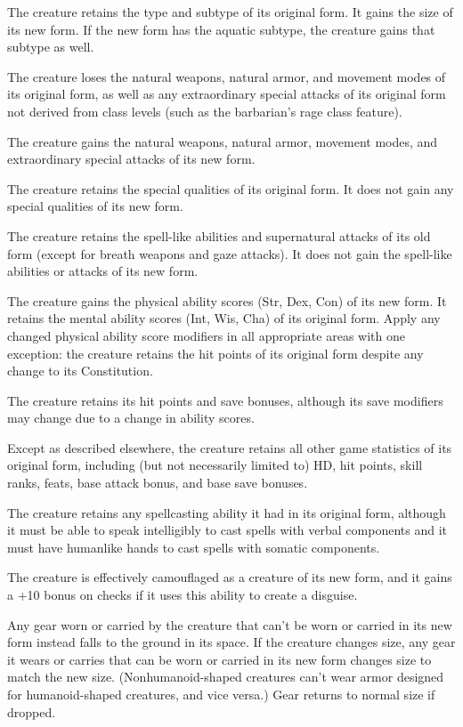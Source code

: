 \begin{itemize*}
\item The creature retains the type and subtype of its original form. It gains the size of its new form. If the new form has the aquatic subtype, the creature gains that subtype as well.
\item The creature loses the natural weapons, natural armor, and movement modes of its original form, as well as any extraordinary special attacks of its original form not derived from class levels (such as the barbarian's rage class feature).
\item The creature gains the natural weapons, natural armor, movement modes, and extraordinary special attacks of its new form.
\item The creature retains the special qualities of its original form. It does not gain any special qualities of its new form.
\item The creature retains the spell-like abilities and supernatural attacks of its old form (except for breath weapons and gaze attacks). It does not gain the spell-like abilities or attacks of its new form.
\item The creature gains the physical ability scores (Str, Dex, Con) of its new form. It retains the mental ability scores (Int, Wis, Cha) of its original form. Apply any changed physical ability score modifiers in all appropriate areas with one exception: the creature retains the hit points of its original form despite any change to its Constitution.
\item The creature retains its hit points and save bonuses, although its save modifiers may change due to a change in ability scores.
\item Except as described elsewhere, the creature retains all other game statistics of its original form, including (but not necessarily limited to) HD, hit points, skill ranks, feats, base attack bonus, and base save bonuses.
\item The creature retains any spellcasting ability it had in its original form, although it must be able to speak intelligibly to cast spells with verbal components and it must have humanlike hands to cast spells with somatic components.
\item The creature is effectively camouflaged as a creature of its new form, and it gains a +10 bonus on  checks if it uses this ability to create a disguise.
\item Any gear worn or carried by the creature that can't be worn or carried in its new form instead falls to the ground in its space. If the creature changes size, any gear it wears or carries that can be worn or carried in its new form changes size to match the new size. (Nonhumanoid-shaped creatures can't wear armor designed for humanoid-shaped creatures, and vice versa.) Gear returns to normal size if dropped.
\end{itemize*}

